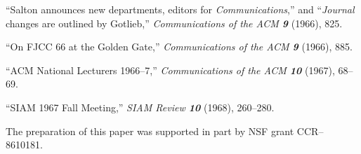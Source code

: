 \bib
[36] ``Salton announces new departments, editors for
{\sl Communications\/},'' and ``{\sl Journal\/} changes are outlined by
Gotlieb,''  {\sl Communications of the ACM\/ \bf 9} (1966), 825.

\bib
[37] ``On FJCC 66 at the Golden Gate,'' {\sl Communications of the
ACM\/ \bf 9} (1966), 885.

\bib
[38] ``ACM National Lecturers 1966--7,'' {\sl Communications of the
ACM\/ \bf 10} (1967), 68--69.

\bib
[39] ``SIAM 1967 Fall Meeting,'' {\sl SIAM Review\/ \bf 10} (1968),
260--280. 


\bigskip\bigskip
\noindent
{\eightrm
The preparation of this paper was supported in part by
NSF grant CCR--8610181.}


\bye